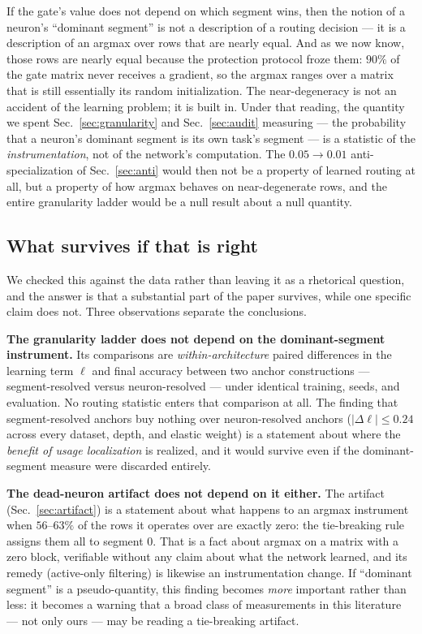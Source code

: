 \documentclass[10pt]{article}
\begin{document}
If the gate's value does not depend on which segment wins, then the
notion of a neuron's ``dominant segment'' is not a description of a
routing decision --- it is a description of an argmax over rows that are
nearly equal. And as we now know, those rows are nearly equal because
the protection protocol froze them: $90\%$ of the gate matrix never
receives a gradient, so the argmax ranges over a matrix that is still
essentially its random initialization. The near-degeneracy is not an
accident of the learning problem; it is built in. Under that reading, the quantity we spent
Sec.~\ref{sec:granularity} and Sec.~\ref{sec:audit} measuring --- the
probability that a neuron's dominant segment is its own task's segment ---
is a statistic of the \emph{instrumentation}, not of the network's
computation. The $0.05\to 0.01$ anti-specialization of
Sec.~\ref{sec:anti} would then not be a property of learned routing at
all, but a property of how argmax behaves on near-degenerate rows, and
the entire granularity ladder would be a null result about a null
quantity.

\subsection{What survives if that is right}

We checked this against the data rather than leaving it as a rhetorical
question, and the answer is that a substantial part of the paper survives,
while one specific claim does not. Three observations separate the
conclusions.

\textbf{The granularity ladder does not depend on the dominant-segment
instrument.} Its comparisons are \emph{within-architecture} paired
differences in the learning term $\ell$ and final accuracy between two
anchor constructions --- segment-resolved versus neuron-resolved --- under
identical training, seeds, and evaluation. No routing statistic enters
that comparison at all. The finding that segment-resolved anchors buy
nothing over neuron-resolved anchors ($|\Delta\ell|\le 0.24$ across every
dataset, depth, and elastic weight) is a statement about where the
\emph{benefit of usage localization} is realized, and it would survive
even if the dominant-segment measure were discarded entirely.

\textbf{The dead-neuron artifact does not depend on it either.} The
artifact (Sec.~\ref{sec:artifact}) is a statement about what happens to
an argmax instrument when $56$--$63\%$ of the rows it operates over are
exactly zero: the tie-breaking rule assigns them all to segment $0$.
That is a fact about argmax on a matrix with a zero block, verifiable
without any claim about what the network learned, and its remedy
(active-only filtering) is likewise an instrumentation change. If
``dominant segment'' is a pseudo-quantity, this finding becomes
\emph{more} important rather than less: it becomes a warning that a
broad class of measurements in this literature --- not only ours --- may be
reading a tie-breaking artifact.
\end{document}
